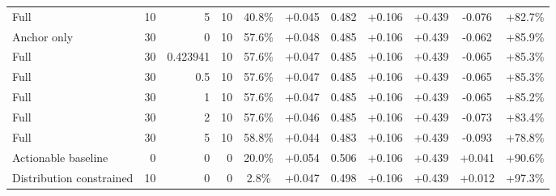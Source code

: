 \begin{table}[htbp]
\begin{tabular}{lrrrccccccc}
Full & 10 & 5 & 10 & 40.8\% & +0.045 & 0.482 & +0.106 & +0.439 & -0.076 & +82.7\% \\
Anchor only & 30 & 0 & 10 & 57.6\% & +0.048 & 0.485 & +0.106 & +0.439 & -0.062 & +85.9\% \\
Full & 30 & 0.423941 & 10 & 57.6\% & +0.047 & 0.485 & +0.106 & +0.439 & -0.065 & +85.3\% \\
Full & 30 & 0.5 & 10 & 57.6\% & +0.047 & 0.485 & +0.106 & +0.439 & -0.065 & +85.3\% \\
Full & 30 & 1 & 10 & 57.6\% & +0.047 & 0.485 & +0.106 & +0.439 & -0.065 & +85.2\% \\
Full & 30 & 2 & 10 & 57.6\% & +0.046 & 0.485 & +0.106 & +0.439 & -0.073 & +83.4\% \\
Full & 30 & 5 & 10 & 58.8\% & +0.044 & 0.483 & +0.106 & +0.439 & -0.093 & +78.8\% \\
Actionable baseline & 0 & 0 & 0 & 20.0\% & +0.054 & 0.506 & +0.106 & +0.439 & +0.041 & +90.6\% \\
Distribution constrained & 10 & 0 & 0 & 2.8\% & +0.047 & 0.498 & +0.106 & +0.439 & +0.012 & +97.3\% \\
\bottomrule
\end{tabular}
\end{table}